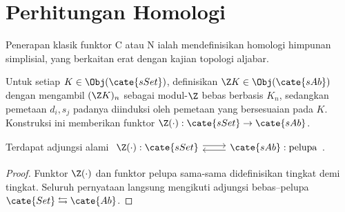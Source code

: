 
\section{Perhitungan Homologi}\label{sec:homology-computation}
\hypertarget{o014.aljabr2.chapter8.homology-computation}{ }
Penerapan klasik funktor $\mathrm{C}$ atau $\mathrm{N}$ ialah mendefinisikan
homologi himpunan simplisial, yang berkaitan erat dengan kajian topologi
aljabar.

\begin{definition}\label{def:free-simplicial-Ab}
	Untuk setiap $K\in\Obj(\cate{sSet})$, definisikan
	$\Z K\in\Obj(\cate{sAb})$ dengan mengambil $(\Z K)_n$ sebagai
	modul-$\Z$ bebas berbasis $K_n$, sedangkan pemetaan $d_i,s_j$ padanya
	diinduksi oleh pemetaan yang bersesuaian pada $K$. Konstruksi ini
	memberikan funktor $\Z(\cdot):\cate{sSet}\to\cate{sAb}$.
\end{definition}

\begin{proposition}\label{prop:free-simplicial-Ab-adjunction}
	Terdapat adjungsi alami
	$\begin{tikzcd}
		\Z(\cdot):\cate{sSet}\arrow[shift left,r]
		&\cate{sAb}:\text{pelupa}\arrow[shift left,l]
	\end{tikzcd}$.
\end{proposition}
\begin{proof}
	Funktor $\Z(\cdot)$ dan funktor pelupa sama-sama didefinisikan tingkat demi
	tingkat. Seluruh pernyataan langsung mengikuti adjungsi bebas--pelupa
	$\cate{Set}\leftrightarrows\cate{Ab}$.
\end{proof}


